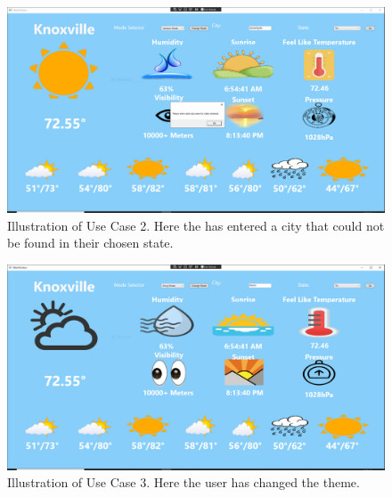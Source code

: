 \documentclass[10pt,conference,onecolumn,compsoc]{IEEEtran}
\begin{document}
\begin{figure}[ht!]
\includegraphics[scale=0.1]{use_case_2.png}
\caption{Illustration of Use Case 2. Here the has entered a city that could not be found in their chosen state.}
\label{use_case_2}
\end{figure}

\begin{figure}[ht!]
\includegraphics[scale=0.1]{use_case_3.png}
\caption{Illustration of Use Case 3. Here the user has changed the theme.}
\label{use_case_3}
\end{figure}
\end{document}
